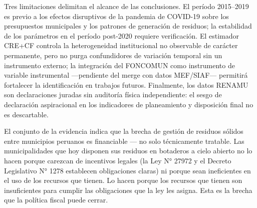 Tres limitaciones delimitan el alcance de las conclusiones. El período 2015--2019 es previo a los efectos disruptivos de la pandemia de COVID-19 sobre los presupuestos municipales y los patrones de generación de residuos; la estabilidad de los parámetros en el período post-2020 requiere verificación. El estimador CRE+CF controla la heterogeneidad institucional no observable de carácter permanente, pero no purga confundidores de variación temporal sin un instrumento externo; la integración del FONCOMUN como instrumento de variable instrumental ---pendiente del merge con datos MEF/SIAF--- permitirá fortalecer la identificación en trabajos futuros. Finalmente, los datos RENAMU son declaraciones juradas sin auditoría física independiente: el sesgo de declaración aspiracional en los indicadores de planeamiento y disposición final no es descartable.

El conjunto de la evidencia indica que la brecha de gestión de residuos sólidos entre municipios peruanos es financiable --- no solo técnicamente tratable. Las municipalidades que hoy disponen sus residuos en botaderos a cielo abierto no lo hacen porque carezcan de incentivos legales (la Ley N° 27972 y el Decreto Legislativo N° 1278 establecen obligaciones claras) ni porque sean ineficientes en el uso de los recursos que tienen. Lo hacen porque los recursos que tienen son insuficientes para cumplir las obligaciones que la ley les asigna. Esta es la brecha que la política fiscal puede cerrar.
